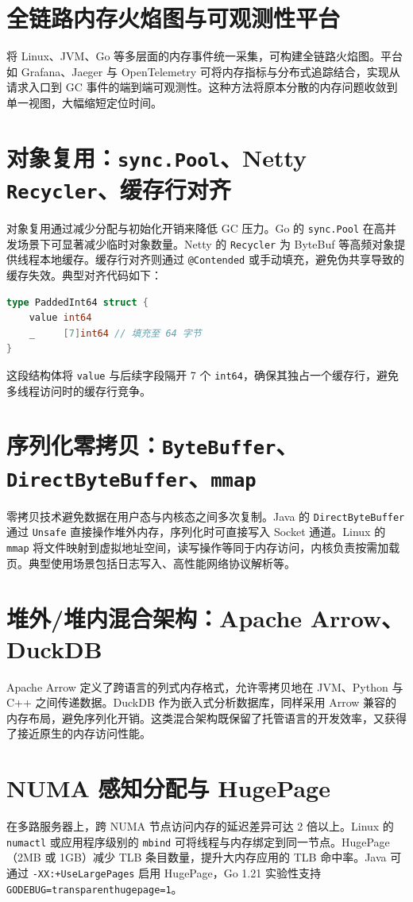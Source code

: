 \chapter{全链路内存火焰图与可观测性平台}
将 Linux、JVM、Go 等多层面的内存事件统一采集，可构建全链路火焰图。平台如 Grafana、Jaeger 与 OpenTelemetry 可将内存指标与分布式追踪结合，实现从请求入口到 GC 事件的端到端可观测性。这种方法将原本分散的内存问题收敛到单一视图，大幅缩短定位时间。\par
\chapter{对象复用：\texttt{sync.Pool}、Netty \texttt{Recycler}、缓存行对齐}
对象复用通过减少分配与初始化开销来降低 GC 压力。Go 的 \texttt{sync.Pool} 在高并发场景下可显著减少临时对象数量。Netty 的 \texttt{Recycler} 为 ByteBuf 等高频对象提供线程本地缓存。缓存行对齐则通过 \texttt{@Contended} 或手动填充，避免伪共享导致的缓存失效。典型对齐代码如下：\par
\begin{lstlisting}[language=go]
type PaddedInt64 struct {
    value int64
    _     [7]int64 // 填充至 64 字节
}
\end{lstlisting}
这段结构体将 \texttt{value} 与后续字段隔开 7 个 \texttt{int64}，确保其独占一个缓存行，避免多线程访问时的缓存行竞争。\par
\chapter{序列化零拷贝：\texttt{ByteBuffer}、\texttt{DirectByteBuffer}、\texttt{mmap}}
零拷贝技术避免数据在用户态与内核态之间多次复制。Java 的 \texttt{DirectByteBuffer} 通过 \texttt{Unsafe} 直接操作堆外内存，序列化时可直接写入 Socket 通道。Linux 的 \texttt{mmap} 将文件映射到虚拟地址空间，读写操作等同于内存访问，内核负责按需加载页。典型使用场景包括日志写入、高性能网络协议解析等。\par
\chapter{堆外/堆内混合架构：Apache Arrow、DuckDB}
Apache Arrow 定义了跨语言的列式内存格式，允许零拷贝地在 JVM、Python 与 C++ 之间传递数据。DuckDB 作为嵌入式分析数据库，同样采用 Arrow 兼容的内存布局，避免序列化开销。这类混合架构既保留了托管语言的开发效率，又获得了接近原生的内存访问性能。\par
\chapter{NUMA 感知分配与 HugePage}
在多路服务器上，跨 NUMA 节点访问内存的延迟差异可达 2 倍以上。Linux 的 \texttt{numactl} 或应用程序级别的 \texttt{mbind} 可将线程与内存绑定到同一节点。HugePage（2MB 或 1GB）减少 TLB 条目数量，提升大内存应用的 TLB 命中率。Java 可通过 \texttt{-XX:+UseLargePages} 启用 HugePage，Go 1.21 实验性支持 \texttt{GODEBUG=transparenthugepage=1}。\par
